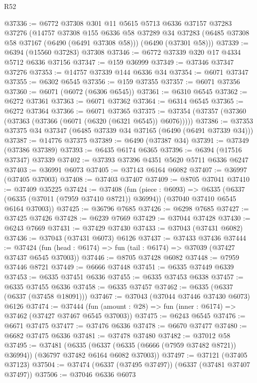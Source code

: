 \begin{lexlean}{R52}
\begin{coremodule}
@37336 := @6772
    @37308
    @301
    @11
    @5615
    @5713
    @6336
    @37157
    @37283
    @37276
    (@14757
      @37308
      @155
      @6336
      @58
      @37289
      @34
      @37283
      (@6485 @37308 @58 @37167 (@6490 (@6491 @37308 @58)))
      (@6490 (@37301 @58)))
@37339 := @6394 (@15560 @37283) @37308
@37346 := @6772 @37339 @320 @17 @4334 @5712 @6336 @37156
@37347 := @159 @36999
@37349 := @37346 @37347 @37276
@37353 := @14757 @37339 @144 @6336 @34
@37354 := @6071 @37347
@37355 := @6302 @6545
@37356 := @159 @37355
@37357 := @6071 @37356
@37360 := @6071 (@6072 (@6306 @6545))
@37361 := @6310 @6545
@37362 := @6272 @37361
@37363 := @6071 @37362
@37364 := @6314 @6545
@37365 := @6272 @37364
@37366 := @6071 @37365
@37375 := @37354 (@37357 (@37360 (@37363 (@37366 (@6071 (@6320 (@6321 @6545)) @6076)))))
@37386 := @37353 @37375 @34 @37347 (@6485 @37339 @34 @37165 (@6490 (@6491 @37339 @34)))
@37387 := @14776 @37375
@37389 := @6490 (@37387 @34)
@37391 := @37349 (@37386 @37389)
@37393 := @6435 @6174 @6365
@37396 := @6394 (@17516 @37347) @37339
@37402 := @37393 @37396 @4351 @5620 @5711 @6336 @6247
@37403 := @36991 @6073
@37405 := @37143 @6164 @6082
@37407 := @36997 (@37405 @37003)
@37408 := @37403 @37407
@37409 := @8705 @37041
@37410 := @37409 @35225
@37424 := @37408
    (fun (piece : @6093) =>
    @6335 (@6337 (@6335 (@37011 (@7959 @37410 @8721)) @36994)) (@37040 @37410 @6545 @6164 @37003))
@37425 := @36796 @7685
@37426 := @6298 @7685
@37427 := @37425 @37426
@37428 := @6239 @7669
@37429 := @37044 @37428
@37430 := @6243 @7669
@37431 := @37429 @37430
@37433 := @37043 (@37431 @6082)
@37436 := @37043 (@37431 @6073) @6126
@37437 := @37433 @37436
@37444 := @37424 (fun (head : @6174) => fun (tail : @6174) => @37039 (@37427 @37437 @6545 @37003))
@37446 := @8705 @37428 @6082
@37448 := @7959 @37446 @8721
@37449 := @6666 @37448
@37451 := @6335 @37449 @6339
@37453 := @6335 @37451 @6336
@37455 := @6335 @37453 @6338
@37457 := @6335 @37455 @6336
@37458 := @6335 @37457
@37462 := @6335 (@6337 (@6337 (@37458 @18091)))
@37467 := @37043 (@37044 @37446 @37430 @6073) @6126
@37474 := @37444 (fun (amount : @28) => fun (inner : @6174) => @37462 (@37427 @37467 @6545 @37003))
@37475 := @6243 @6545
@37476 := @6671 @37475
@37477 := @37476 @6336
@37478 := @6670 @37477
@37480 := @6682 @37475 @6336
@37481 := @37478 @37480
@37482 := @37012 @58
@37495 := @37481
    (@6335 (@6337 (@6335 (@6666 (@7959 @37482 @8721)) @36994)) (@36797 @37482 @6164 @6082 @37003))
@37497 := @37121 (@37405 @37123)
@37504 := @37474 (@6337 (@37495 @37497)) (@6337 (@37481 @37407 @37497))
@37506 := @37046 @6336 @6073

\end{coremodule}
\end{lexlean}
